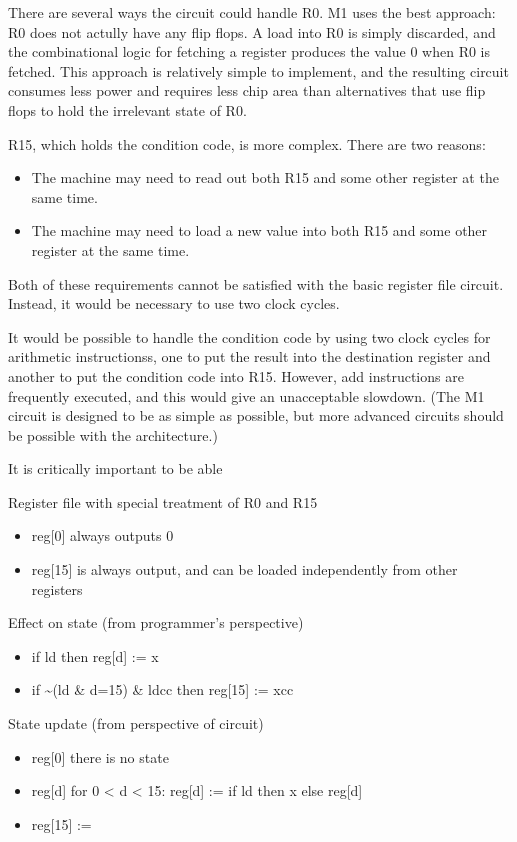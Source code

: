 \documentclass[11pt]{article}
\begin{document}
There are several ways the circuit could handle R0.  M1 uses the best
approach: R0 does not actully have any flip flops.  A load into R0 is
simply discarded, and the combinational logic for fetching a register
produces the value 0 when R0 is fetched.  This approach is  relatively
simple to implement, and the resulting circuit consumes less power and
requires less chip area than alternatives that use flip flops to  hold
the irrelevant state of R0.

R15, which holds the condition code, is more complex.  There are two
reasons:
\begin{itemize}
\item The machine may need to read out both R15 and some other register at
the same time.
\item The machine may need to load a new value into both R15 and some
other register at the same time.
\end{itemize}

Both of these requirements cannot be satisfied with the basic register
file circuit.  Instead, it would be necessary to use two clock cycles.

It would be possible to handle the condition code by using two clock
cycles for arithmetic instructionss, one to put the result into the
destination register and another to put the condition code into R15.
However, add instructions are frequently executed, and this would give
an unacceptable slowdown.  (The M1 circuit is designed to be as simple
as possible, but more advanced circuits should be possible with the
architecture.)

It is critically important to be able

Register file with special treatment of R0 and R15

\begin{itemize}
\item reg[0] always outputs 0
\item reg[15] is always output, and can be loaded independently from other registers
\end{itemize}

Effect on state (from programmer's perspective)
\begin{itemize}
\item if ld                   then reg[d] := x
\item if \textasciitilde{}(ld \& d=15) \& ldcc  then reg[15] := xcc
\end{itemize}

State update (from perspective of circuit)
\begin{itemize}
\item reg[0] there is no state
\item reg[d] for 0 < d < 15:  reg[d] := if ld then x else reg[d]
\item reg[15] :=
\end{itemize}
\end{document}
